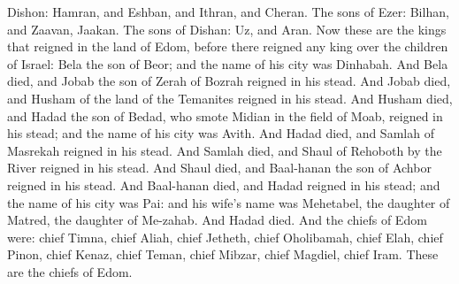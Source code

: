 Dishon: Hamran, and Eshban, and Ithran, and Cheran. The sons of Ezer: Bilhan, and Zaavan, Jaakan. The sons of Dishan: Uz, and Aran.  Now these are the kings that reigned in the land of Edom, before there reigned any king over the children of Israel: Bela the son of Beor; and the name of his city was Dinhabah. And Bela died, and Jobab the son of Zerah of Bozrah reigned in his stead. And Jobab died, and Husham of the land of the Temanites reigned in his stead. And Husham died, and Hadad the son of Bedad, who smote Midian in the field of Moab, reigned in his stead; and the name of his city was Avith. And Hadad died, and Samlah of Masrekah reigned in his stead. And Samlah died, and Shaul of Rehoboth by the River reigned in his stead. And Shaul died, and Baal-hanan the son of Achbor reigned in his stead. And Baal-hanan died, and Hadad reigned in his stead; and the name of his city was Pai: and his wife’s name was Mehetabel, the daughter of Matred, the daughter of Me-zahab. And Hadad died. And the chiefs of Edom were: chief Timna, chief Aliah, chief Jetheth, chief Oholibamah, chief Elah, chief Pinon, chief Kenaz, chief Teman, chief Mibzar, chief Magdiel, chief Iram. These are the chiefs of Edom. 

